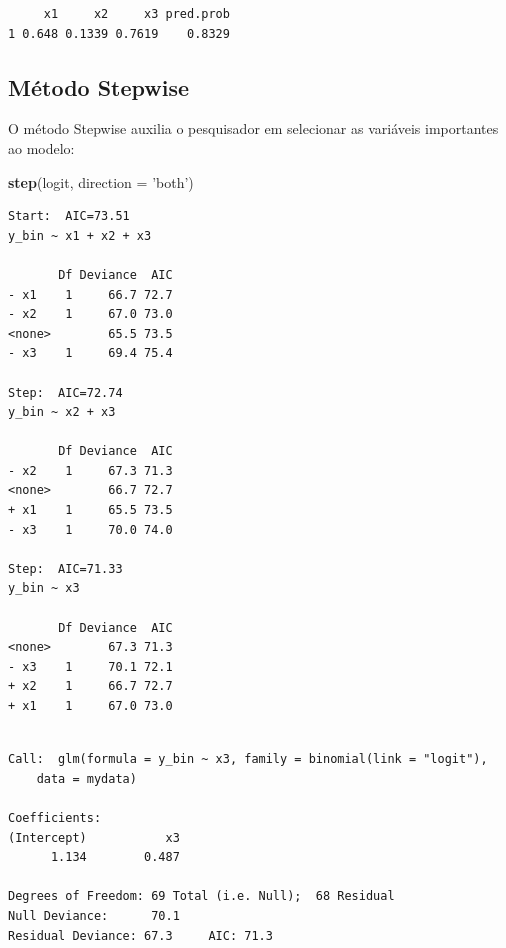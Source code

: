 \documentclass[12pt,brazil,oneside]{book}
\newenvironment{Shaded}{\begin{snugshade}}{\end{snugshade}}
\newcommand{\DataTypeTok}[1]{\textcolor[rgb]{0.13,0.29,0.53}{#1}}
\newcommand{\KeywordTok}[1]{\textcolor[rgb]{0.13,0.29,0.53}{\textbf{#1}}}
\newcommand{\NormalTok}[1]{#1}
\newcommand{\OperatorTok}[1]{\textcolor[rgb]{0.81,0.36,0.00}{\textbf{#1}}}
\newcommand{\StringTok}[1]{\textcolor[rgb]{0.31,0.60,0.02}{#1}}
\begin{document}
\begin{Shaded}
\end{Shaded}

\begin{verbatim}
     x1     x2     x3 pred.prob
1 0.648 0.1339 0.7619    0.8329
\end{verbatim}

\hypertarget{metodo-stepwise}{%
\subsection{Método Stepwise}\label{metodo-stepwise}}

O método Stepwise auxilia o pesquisador em selecionar as variáveis
importantes ao modelo:

\begin{Shaded}
\begin{Highlighting}[]
\KeywordTok{step}\NormalTok{(logit, }\DataTypeTok{direction =} \StringTok{'both'}\NormalTok{)}
\end{Highlighting}
\end{Shaded}

\begin{verbatim}
Start:  AIC=73.51
y_bin ~ x1 + x2 + x3

       Df Deviance  AIC
- x1    1     66.7 72.7
- x2    1     67.0 73.0
<none>        65.5 73.5
- x3    1     69.4 75.4

Step:  AIC=72.74
y_bin ~ x2 + x3

       Df Deviance  AIC
- x2    1     67.3 71.3
<none>        66.7 72.7
+ x1    1     65.5 73.5
- x3    1     70.0 74.0

Step:  AIC=71.33
y_bin ~ x3

       Df Deviance  AIC
<none>        67.3 71.3
- x3    1     70.1 72.1
+ x2    1     66.7 72.7
+ x1    1     67.0 73.0
\end{verbatim}

\begin{verbatim}

Call:  glm(formula = y_bin ~ x3, family = binomial(link = "logit"), 
    data = mydata)

Coefficients:
(Intercept)           x3  
      1.134        0.487  

Degrees of Freedom: 69 Total (i.e. Null);  68 Residual
Null Deviance:      70.1 
Residual Deviance: 67.3     AIC: 71.3
\end{verbatim}
\end{document}
